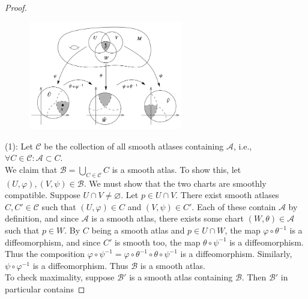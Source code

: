 \documentclass[reqno]{amsart}
\theoremstyle{plain}%
\theoremstyle{definition}
\theoremstyle{remark}
\begin{document}
            \begin{proof}
            \begin{figure}[H]
                \centering
                \includegraphics[width=0.6\textwidth]{prop-1-17-a.png}
                \label{fig:prop-1-17-a-png}
            \end{figure}
            (1): Let $\mathcal{C}$ be the collection of all
            smooth atlases containing $\mathcal{A}$, i.e.,
            $\forall C \in \mathcal{C} \colon \mathcal{A}\subset C$.\\
            We claim that $\mathcal{B}= \bigcup_{C \in \mathcal{C}} C$ is a smooth
            atlas. To show this, let
            $\left( U, \varphi \right) ,
            \left( V, \psi \right) \in 
            \mathcal{B}$. We must show that
            the two charts are smoothly compatible. Suppose
            $U \cap V \neq \varnothing$. Let
            $p \in U \cap V$. There
            exist smooth atlases $C,C' \in \mathcal{C}$ such that
            $\left( U, \varphi \right) \in C$ and
            $\left( V, \psi \right) \in C'$. Each of these contain
            $\mathcal{A}$ by definition, and since $\mathcal{A}$ is a smooth atlas,
            there exists some chart $\left( W, \theta \right) 
            \in \mathcal{A}$ such that $p \in W$. By $C$ being a smooth atlas
            and  $p \in U \cap W$, the map
            $\varphi \circ \theta^{-1}$ is a diffeomorphism, and
            since $C'$ is smooth too, the map
            $\theta \circ \psi^{-1}$ is a diffeomorphism. Thus the composition
            $\varphi \circ \psi^{-1} =
            \varphi \circ \theta^{-1} \circ \theta \circ \psi^{-1}$ is
            a diffeomorphism. Similarly, $\psi \circ \varphi^{-1}$ is a diffeomorphism.
            Thus $\mathcal{B}$ is a smooth atlas.\\
            To check maximality, suppose $\mathcal{B}'$ is a smooth atlas containing
            $\mathcal{B}$. Then $\mathcal{B'}$ in particular contains

\end{proof}
\end{document}
